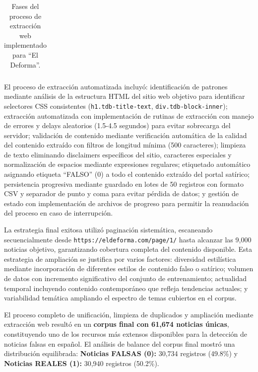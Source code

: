 \begin{table}[htbp]
{\begin{tabular}{|c|l|l|c|c|l|}
\hline
\end{tabular}
}
\caption{Fases del proceso de extracción web implementado para ``El Deforma''.}
\label{tab:web_scraping_proceso}
\end{table}

El proceso de extracción automatizada incluyó: identificación de patrones mediante análisis de la estructura HTML del sitio web objetivo para identificar selectores CSS consistentes (\texttt{h1.tdb-title-text}, \texttt{div.tdb-block-inner}); extracción automatizada con implementación de rutinas de extracción con manejo de errores y delays aleatorios (1.5-4.5 segundos) para evitar sobrecarga del servidor; validación de contenido mediante verificación automática de la calidad del contenido extraído con filtros de longitud mínima (500 caracteres); limpieza de texto eliminando disclaimers específicos del sitio, caracteres especiales y normalización de espacios mediante expresiones regulares; etiquetado automático asignando etiqueta ``FALSO'' (0) a todo el contenido extraído del portal satírico; persistencia progresiva mediante guardado en lotes de 50 registros con formato CSV y separador de punto y coma para evitar pérdida de datos; y gestión de estado con implementación de archivos de progreso para permitir la reanudación del proceso en caso de interrupción.

La estrategia final exitosa utilizó paginación sistemática, escaneando secuencialmente desde \texttt{https://eldeforma.com/page/1/} hasta alcanzar las 9,000 noticias objetivo, garantizando cobertura completa del contenido disponible. Esta estrategia de ampliación se justifica por varios factores: diversidad estilística mediante incorporación de diferentes estilos de contenido falso o satírico; volumen de datos con incremento significativo del conjunto de entrenamiento; actualidad temporal incluyendo contenido contemporáneo que refleja tendencias actuales; y variabilidad temática ampliando el espectro de temas cubiertos en el corpus.

El proceso completo de unificación, limpieza de duplicados y ampliación mediante extracción web resultó en un \textbf{corpus final con 61,674 noticias únicas}, constituyendo uno de los recursos más extensos disponibles para la detección de noticias falsas en español. El análisis de balance del corpus final mostró una distribución equilibrada: \textbf{Noticias FALSAS (0):} 30,734 registros (49.8\%) y \textbf{Noticias REALES (1):} 30,940 registros (50.2\%).

